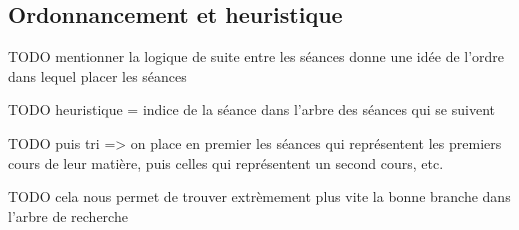 
\subsection{Ordonnancement et heuristique}

TODO mentionner la logique de suite entre les séances donne une idée de l'ordre
dans lequel placer les séances

TODO heuristique = indice de la séance dans l'arbre des séances qui se suivent

TODO puis tri => on place en premier les séances qui représentent les premiers
cours de leur matière, puis celles qui représentent un second cours, etc.

TODO cela nous permet de trouver extrèmement plus vite la bonne branche dans
l'arbre de recherche
